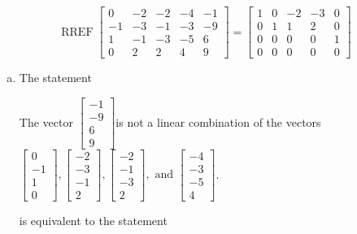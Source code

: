 \begin{exerciseAnswer} 
\[\operatorname{RREF}  \left[\begin{array}{cccc|c}
0 & -2 & -2 & -4 & -1 \\
-1 & -3 & -1 & -3 & -9 \\
1 & -1 & -3 & -5 & 6 \\
0 & 2 & 2 & 4 & 9
\end{array}\right] = \left[\begin{array}{cccc|c}
1 & 0 & -2 & -3 & 0 \\
0 & 1 & 1 & 2 & 0 \\
0 & 0 & 0 & 0 & 1 \\
0 & 0 & 0 & 0 & 0
\end{array}\right] \]
\begin{enumerate}[(a)]
\item  The statement 
\begin{center}\begin{minipage}{0.8\textwidth}
 The vector \( \left[\begin{array}{c}
-1 \\
-9 \\
6 \\
9
\end{array}\right] \)is not a linear combination of the vectors \( \left[\begin{array}{c}
0 \\
-1 \\
1 \\
0
\end{array}\right] , \left[\begin{array}{c}
-2 \\
-3 \\
-1 \\
2
\end{array}\right] , \left[\begin{array}{c}
-2 \\
-1 \\
-3 \\
2
\end{array}\right] , \text{ and } \left[\begin{array}{c}
-4 \\
-3 \\
-5 \\
4
\end{array}\right] \). 
\end{minipage}\end{center}
     is equivalent to the statement 
\begin{center}\begin{minipage}{0.8\textwidth}

\end{minipage}
\end{center}
\end{enumerate}
\end{exerciseAnswer}
